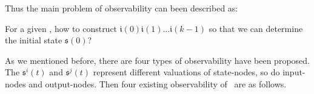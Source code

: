  Thus the main problem of observability can been described as: 
\begin{problem}
\label{pro:1}
For a given  \BCN, how to construct $\mathfrak{i}(0)$$\mathfrak{i}(1)\ldots$$\mathfrak{i}(k-1)$ so that we can determine the initial state $\mathfrak{s}(0)$?
\end{problem}

As we mentioned before, there are four types of observability have been proposed. The $\mathfrak{s}^{i}(t)$ and $\mathfrak{s}^{j}(t)$ represent different valuations of state-nodes, so do input-nodes and output-nodes. Then four existing observability of \BCNs\ are as follows. 



